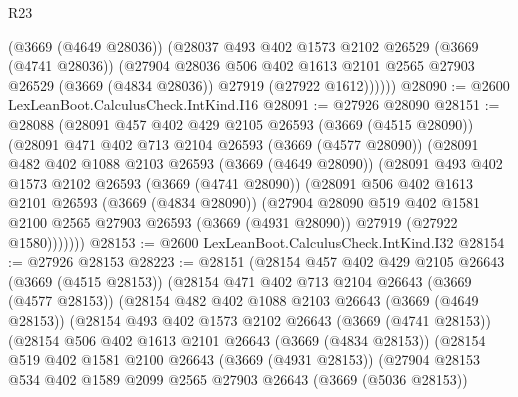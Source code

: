 \begin{lexlean}{R23}
\begin{coremodule}
          (@3669 (@4649 @28036))
          (@28037
            @493
            @402
            @1573
            @2102
            @26529
            (@3669 (@4741 @28036))
            (@27904
              @28036
              @506
              @402
              @1613
              @2101
              @2565
              @27903
              @26529
              (@3669 (@4834 @28036))
              @27919
              (@27922 @1612))))))
@28090 := @2600 LexLeanBoot.CalculusCheck.IntKind.I16
@28091 := @27926 @28090
@28151 := @28088
    (@28091
      @457
      @402
      @429
      @2105
      @26593
      (@3669 (@4515 @28090))
      (@28091
        @471
        @402
        @713
        @2104
        @26593
        (@3669 (@4577 @28090))
        (@28091
          @482
          @402
          @1088
          @2103
          @26593
          (@3669 (@4649 @28090))
          (@28091
            @493
            @402
            @1573
            @2102
            @26593
            (@3669 (@4741 @28090))
            (@28091
              @506
              @402
              @1613
              @2101
              @26593
              (@3669 (@4834 @28090))
              (@27904
                @28090
                @519
                @402
                @1581
                @2100
                @2565
                @27903
                @26593
                (@3669 (@4931 @28090))
                @27919
                (@27922 @1580)))))))
@28153 := @2600 LexLeanBoot.CalculusCheck.IntKind.I32
@28154 := @27926 @28153
@28223 := @28151
    (@28154
      @457
      @402
      @429
      @2105
      @26643
      (@3669 (@4515 @28153))
      (@28154
        @471
        @402
        @713
        @2104
        @26643
        (@3669 (@4577 @28153))
        (@28154
          @482
          @402
          @1088
          @2103
          @26643
          (@3669 (@4649 @28153))
          (@28154
            @493
            @402
            @1573
            @2102
            @26643
            (@3669 (@4741 @28153))
            (@28154
              @506
              @402
              @1613
              @2101
              @26643
              (@3669 (@4834 @28153))
              (@28154
                @519
                @402
                @1581
                @2100
                @26643
                (@3669 (@4931 @28153))
                (@27904
                  @28153
                  @534
                  @402
                  @1589
                  @2099
                  @2565
                  @27903
                  @26643
                  (@3669 (@5036 @28153))

\end{coremodule}
\end{lexlean}
